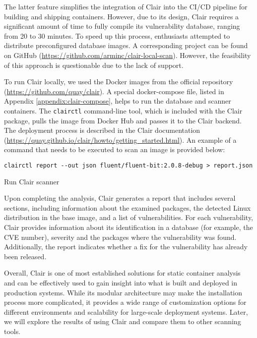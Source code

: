 The latter feature simplifies the integration of Clair into the CI/CD pipeline for building and shipping containers. However, due to its design, Clair requires a significant amount of time to fully compile its vulnerability database, ranging from 20 to 30 minutes. To speed up this process, enthusiasts attempted to distribute preconfigured database images. A corresponding project can be found on GitHub (\url{https://github.com/arminc/clair-local-scan}). However, the feasibility of this approach is questionable due to the lack of support.

To run Clair locally, we used the Docker images from the official repository (\url{https://github.com/quay/clair}). A special docker-compose file, listed in Appendix \ref{appendix:clair-compose}, helps to run the database and scanner containers. The \texttt{clairctl} command-line tool, which is included with the Clair package, pulls the image from Docker Hub and passes it to the Clair backend. The deployment process is described in the Clair documentation (\url{https://quay.github.io/clair/howto/getting_started.html}). An example of a command that needs to be executed to scan an image is provided below:

\begin{listing}[htp]
    \centering
    \begin{minipage}{0.95\linewidth}
        \begin{verbatim}
clairctl report --out json fluent/fluent-bit:2.0.8-debug > report.json
        \end{verbatim}
    \end{minipage}
    \caption{Run Clair scanner}
    \label{lst:clair}
\end{listing}

Upon completing the analysis, Clair generates a report that includes several sections, including information about the examined packages, the detected Linux distribution in the base image, and a list of vulnerabilities. For each vulnerability, Clair provides information about its identification in a database (for example, the CVE number), severity and the packages where the vulnerability was found. Additionally, the report indicates whether a fix for the vulnerability has already been released.

Overall, Clair is one of most established solutions for static container analysis and can be effectively used to gain insight into what is built and deployed in production systems. While its modular architecture may make the installation process more complicated, it provides a wide range of customization options for different environments and scalability for large-scale deployment systems. Later, we will explore the results of using Clair and compare them to other scanning tools.

